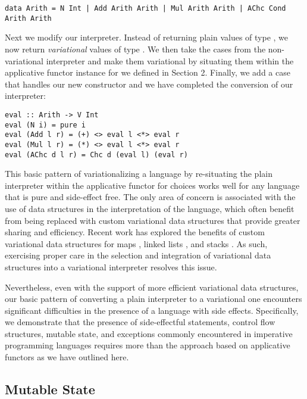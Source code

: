 \documentclass[letterpaper,10pt,onecolumn]{article}
\begin{document}
\begin{lstlisting}
data Arith = N Int | Add Arith Arith | Mul Arith Arith | AChc Cond Arith Arith
\end{lstlisting}

Next we modify our interpreter. Instead of returning plain values of type ,
we now return \emph{variational} values of type . We then take the cases
from the non-variational interpreter and make them variational by situating them within the
applicative functor instance for  we defined in Section 2. Finally, we add a case
that handles our new  constructor and we have completed the conversion of our
interpreter:

\begin{lstlisting}
eval :: Arith -> V Int
eval (N i) = pure i
eval (Add l r) = (+) <> eval l <*> eval r
eval (Mul l r) = (*) <> eval l <*> eval r
eval (AChc d l r) = Chc d (eval l) (eval r)
\end{lstlisting}

This basic pattern of variationalizing a language by re-situating the
plain interpreter within the applicative functor for choices works well for any language that is pure
and side-effect free. The only area of concern is associated with the use of data structures in the
interpretation of the language, which often benefit from being replaced with custom variational data structures that
provide greater sharing and efficiency. Recent work has explored the benefits of custom variational
data structures for maps \cite{walkingshaw2014variational}, linked lists \cite{lists}, and stacks \cite{stacks}.
As such, exercising proper care in the selection and integration of variational data structures
into a variational interpreter resolves this issue.

Nevertheless, even with the support of more efficient
variational data structures, our basic pattern of converting a plain interpreter to a variational one
encounters significant difficulties in the presence of a language with side effects. Specifically, we
demonstrate that the presence of side-effectful statements, control flow structures, mutable state, and exceptions
commonly encountered in imperative programming languages requires more than the approach based
on applicative functors as we have outlined here.

\subsection{Mutable State}
\end{document}
